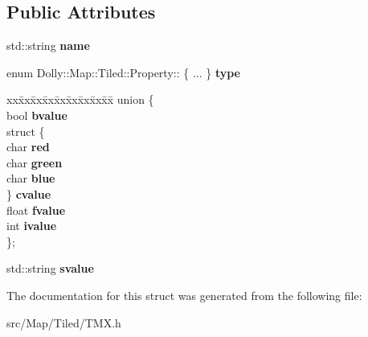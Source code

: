 \subsection*{Public Attributes}
\begin{DoxyCompactItemize}
\item 
\mbox{\label{struct_dolly_1_1_map_1_1_tiled_1_1_property_a1457d3eb5f81967fc9afc9ee5d47270a}} 
std\+::string {\bfseries name}
\item 
\mbox{\label{struct_dolly_1_1_map_1_1_tiled_1_1_property_a3a24dccebb8dd61a302a31eabd5a1ac4}} 
enum Dolly\+::\+Map\+::\+Tiled\+::\+Property\+:: \{ ... \}  {\bfseries type}
\item 
\mbox{\label{struct_dolly_1_1_map_1_1_tiled_1_1_property_a46078437e2fc4f2c5fa1c5eaf2aad81c}} 
\begin{tabbing}
xx\=xx\=xx\=xx\=xx\=xx\=xx\=xx\=xx\=\kill
union \{\\
\>bool {\bfseries bvalue}\\
\>struct \{\\
\>\>char {\bfseries red}\\
\>\>char {\bfseries green}\\
\>\>char {\bfseries blue}\\
\>\} {\bfseries cvalue}\\
\>float {\bfseries fvalue}\\
\>int {\bfseries ivalue}\\
\}; \\

\end{tabbing}\item 
\mbox{\label{struct_dolly_1_1_map_1_1_tiled_1_1_property_a8dea24131b7705d782199833dc22b15e}} 
std\+::string {\bfseries svalue}
\end{DoxyCompactItemize}


The documentation for this struct was generated from the following file\+:\begin{DoxyCompactItemize}
\item 
src/\+Map/\+Tiled/T\+M\+X.\+h\end{DoxyCompactItemize}
